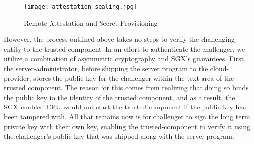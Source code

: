 \documentclass[../main.tex]{subfiles}
\begin{document}
\begin{figure}[H]
  \centering
  \texttt{[image: attestation-sealing.jpg]}
  \caption{Remote Attestation and Secret Provisioning}
  \label{fig:attest}
\end{figure}

However, the process outlined above takes no steps to verify the
challenging entity to the trusted component. In an effort to
authenticate the challenger, we utilize a combination of asymmetric
cryptography and SGX's guarantees.
First, the server-administrator, before shipping the server program to
the cloud-provider, stores the public key for the challenger within
the text-area of the trusted component. The reason for this comes from
realizing that doing so binds the public key to the identity of the
trusted component, and as a result, the SGX-enabled CPU would not
start the trusted-component if the public key has been tampered
with. All that remains now is for challenger to sign the long term
private key with their own key, enabling the trusted-component to
verify it using the challenger's public-key that was shipped along
with the server-program.
\end{document}
